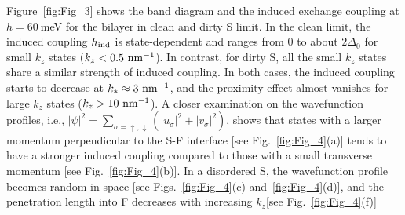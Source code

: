 \documentclass[aps,prl,twocolumn,superscriptaddress,showpacs,longbibliography]{revtex4-1}
\newcommand{\su}{\uparrow}
\newcommand{\sd}{\downarrow}
\begin{document}
Figure~\ref{fig:Fig_3} shows the band diagram and the induced exchange coupling at $h=60~$meV for the bilayer in clean and dirty S limit.
In the clean limit, the induced coupling $h_{\rm{ind}}$ is state-dependent and ranges from 0 to about $2\Delta_0$ for small $k_z$ states ($k_z < 0.5~\rm{nm}^{-1}$).
In contrast, for dirty S, all the small $k_z$ states share a similar strength of induced coupling.
In both cases, the induced coupling starts to decrease at $k_* \approx 3~\rm{nm}^{-1}$, and the proximity effect almost vanishes for large $k_z$ states ($k_z > 10~\rm{nm}^{-1}$).
A closer examination on the wavefunction profiles, i.e., $ |\psi|^2= \sum_{\sigma=\su,\sd}( |u_{\sigma}|^2  + |v_{\sigma}|^2)$, shows that states with a larger momentum perpendicular to the S-F interface [see Fig.~\ref{fig:Fig_4}(a)] tends to have a stronger induced coupling compared to those with a small transverse momentum [see Fig.~\ref{fig:Fig_4}(b)].
In a disordered S, the wavefunction profile becomes random in space [see Figs.~\ref{fig:Fig_4}(c) and~\ref{fig:Fig_4}(d)], and the penetration length into F decreases with increasing $k_z$[see Fig.~\ref{fig:Fig_4}(f)]
\end{document}
